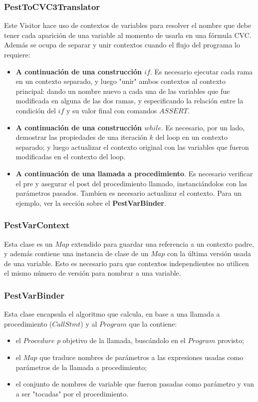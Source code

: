 \documentclass[a4paper]{article}
\begin{document}
\subsubsection{PestToCVC3Translator}

Este Visitor hace uso de contextos de variables para resolver el nombre que debe tener cada aparición de una variable al momento de usarla en una fórmula CVC. Además se ocupa de separar y unir contextos cuando el flujo del programa lo requiere:
\begin{itemize}
\item \textbf{A continuación de una construcción $if$}. Es necesario ejecutar cada rama en un contexto separado, y luego "unir" ambos contextos al contexto principal: dando un nombre nuevo a cada una de las variables que fue modificada en alguna de las dos ramas, y especificando la relación entre la condición del $if$ y su valor final con comandos $ASSERT$.
\item \textbf{A continuación de una construcción $while$}. Es necesario, por un lado, demostrar las propiedades de una iteración $k$ del loop en un contexto separado; y luego actualizar el contexto original con las variables que fueron modificadas en el contexto del loop.
\item \textbf{A continuación de una llamada a procedimiento}. Es necesario verificar el pre y asegurar el post del procedimiento llamado, instanciándolos con las parámetros pasados. Tambien es necesario actualizar el contexto. Para un ejemplo, ver la sección sobre el \textbf{PestVarBinder}.
\end{itemize}

\subsubsection{PestVarContext}

Esta clase es un $Map$ extendido para guardar una referencia a un contexto padre, y además contiene una instancia de clase de un $Map$ con la última versión usada de una variable. Esto es necesario para que contextos independientes no utilicen el mismo número de versión para nombrar a una variable.

\subsubsection{PestVarBinder}

Esta clase encapsula el algoritmo que calcula, en base a una llamada a procedimiento ($CallStmt$) y al $Program$ que la contiene:
\begin{itemize}
\item el $Procedure$ $p$ objetivo de la llamada, buscándolo en el $Program$ provisto;
\item el $Map$ que traduce nombres de parámetros a las expresiones usadas como parámetros de la llamada a procedimiento;
\item el conjunto de nombres de variable que fueron pasadas como parámetro y van a ser "tocadas" por el procedimiento.
\end{itemize}
\end{document}
